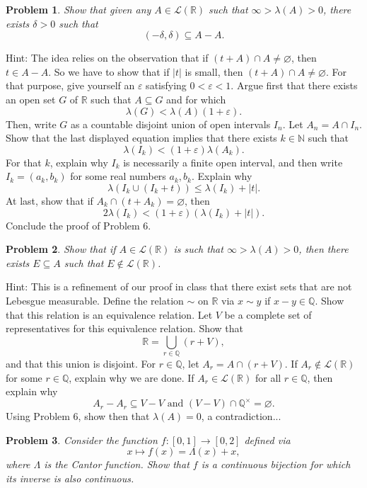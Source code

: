 \documentclass[reqno]{amsart}
\theoremstyle{plain}
\newtheorem{problem}{Problem}
\theoremstyle{definition}
\begin{document}
\begin{problem}
Show that given any $A \in \mathcal{L}(\mathbb{R})$ such that $\infty > \lambda(A) > 0$, there exists $\delta > 0$ such that
$$(-\delta,\delta) \subseteq A - A. $$
\end{problem}
Hint:  The idea relies on the observation that if $(t + A) \cap A \neq \varnothing$, then $t \in A - A$.  So we have to show that if $|t|$ is small, then $(t+A) \cap A \neq \varnothing$.  For that purpose, give yourself an $\varepsilon$ satisfying $0 < \varepsilon < 1$.  Argue first that there exists an open set $G$ of $\mathbb{R}$ such that $A \subseteq G$ and for which 
$$\lambda(G) < \lambda(A)(1+\varepsilon). $$
Then, write $G$ as a countable disjoint union of open intervals $I_{n}$.  Let $A_{n} = A \cap I_{n}$.  Show that the last displayed equation implies that there exists $k \in \mathbb{N}$ such that
$$\lambda(I_{k}) < (1+\varepsilon)\lambda(A_{k}). $$
For that $k$, explain why $I_{k}$ is necessarily a finite open interval, and then write $I_{k} = (a_{k},b_{k})$ for some real numbers $a_{k}, b_{k}$.  Explain why 
$$\lambda(I_{k} \cup (I_{k} + t)) \leq \lambda(I_{k}) + |t|. $$
At last, show that if $A_{k} \cap (t + A_{k}) = \varnothing$, then
$$2\lambda(I_{k})< (1+\varepsilon)(\lambda(I_{k}) + |t|). $$
Conclude the proof of Problem 6.

\begin{problem}
Show that if $A \in \mathcal{L}(\mathbb{R})$ is such that $\infty > \lambda(A) > 0$, then there exists $E \subseteq A$ such that $E \notin \mathcal{L}(\mathbb{R})$.
\end{problem}
Hint:  This is a refinement of our proof in class that there exist sets that are not Lebesgue measurable.  Define the relation $\sim$ on $\mathbb{R}$ via $x \sim y$ if $x - y \in \mathbb{Q}$.  Show that this relation is an equivalence relation.  Let $V$ be a complete set of representatives for this equivalence relation.  Show that
$$\mathbb{R} = \bigcup_{r \in \mathbb{Q}} (r+V),$$
and that this union is disjoint.  For $r \in \mathbb{Q}$, let $A_{r} = A \cap (r+V)$.  If $A_{r} \notin \mathcal{L}(\mathbb{R})$ for some $r \in \mathbb{Q}$, explain why we are done.  If $A_{r} \in \mathcal{L}(\mathbb{R})$ for all $r \in \mathbb{Q}$, then explain why
$$A_{r} - A_{r} \subseteq V - V \text{ and } (V - V) \cap \mathbb{Q}^{\times} = \varnothing. $$
Using Problem 6, show then that $\lambda(A) = 0$, a contradiction...

\begin{problem}
Consider the function $f:[0,1] \rightarrow [0,2]$ defined via
$$x \mapsto f(x) = \Lambda(x) + x, $$
where $\Lambda$ is the Cantor function.  Show that $f$ is a continuous bijection for which its inverse is also continuous.
\end{problem}
\end{document}
